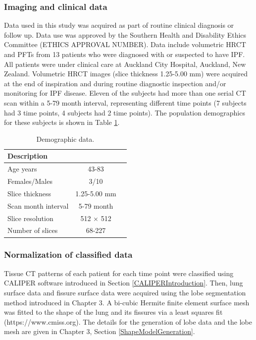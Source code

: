 \subsubsection{Imaging and clinical data}
Data used in this study was acquired as part of routine clinical diagnosis or follow up. Data use was approved by the Southern Health and Disability Ethics Committee (ETHICS APPROVAL NUMBER). Data include volumetric HRCT and PFTs from 13 patients who were diagnosed with or suspected to have IPF. All patients were under clinical care at Auckland City Hospital, Auckland, New Zealand. Volumetric HRCT images (slice thickness 1.25-5.00 mm) were acquired at the end of inspiration and during routine diagnostic inspection and/or monitoring for IPF disease. Eleven of the subjects had more than one serial CT scan within a 5-79 month interval, representing different time points (7 subjects had 3 time points, 4 subjects had 2 time points). The population demographics for these subjects is shown in Table \ref{tab:DemographicData}.
\newpage

\begin{table}[h]
\centering
\caption{Demographic data.}
\label{tab:DemographicData}
\begin{tabular}{| l  | c | c|}
\hline
{\bf Description}  \\ \hline
Age years & 43-83 \\
\hline
Females/Males	& 3/10 \\
\hline
Slice thickness	& 1.25-5.00 mm \\
\hline
Scan month interval	& 5-79 month \\
\hline
Slice resolution	& 512 $\times$ 512 \\
\hline
Number of slices	& 68-227
\\ \hline
\end{tabular}
\end{table}

\subsubsection{Normalization of classified data} \label{DataNormalization}
Tissue CT patterns of each patient for each time point were classified using CALIPER software introduced in Section \ref{CALIPERIntroduction}. Then, lung surface data and fissure surface data were acquired using the lobe segmentation method introduced in Chapter 3. A bi-cubic Hermite finite element surface mesh was fitted to the shape of the lung and its fissures via a least squares fit (https://www.cmiss.org). The details for the generation of lobe data and the lobe mesh are given in Chapter 3, Section \ref{ShapeModelGeneration}.

